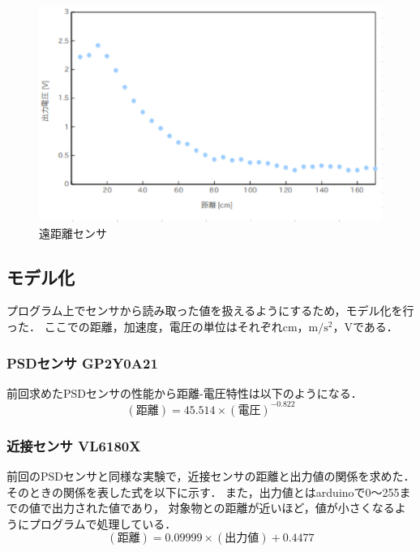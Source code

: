 \documentclass[11pt,a4]{jsarticle}
\begin{document}
\begin{figure}[H]
  \begin{center}
    \includegraphics[width=1.0\hsize]{picture/psdf.eps}
    \caption{遠距離センサ}
    \label{psdf}
  \end{center}
\end{figure}


\subsection{モデル化}
プログラム上でセンサから読み取った値を扱えるようにするため，モデル化を行った．
ここでの距離，加速度，電圧の単位はそれぞれcm，$\mathrm{m}/\mathrm{s}^{2}$，Vである．

\subsubsection{PSDセンサ GP2Y0A21}
前回求めたPSDセンサの性能から距離-電圧特性は以下のようになる．
\begin{equation}
 (距離)=45.514×(電圧)^{-0.822}
\end{equation}

\subsubsection{近接センサ VL6180X}
前回のPSDセンサと同様な実験で，近接センサの距離と出力値の関係を求めた．
そのときの関係を表した式を以下に示す．
また，出力値とはarduinoで0〜255までの値で出力された値であり，
対象物との距離が近いほど，値が小さくなるようにプログラムで処理している．
\begin{equation}
 (距離)=0.09999×(出力値)+0.4477
\end{equation}
\end{document}
